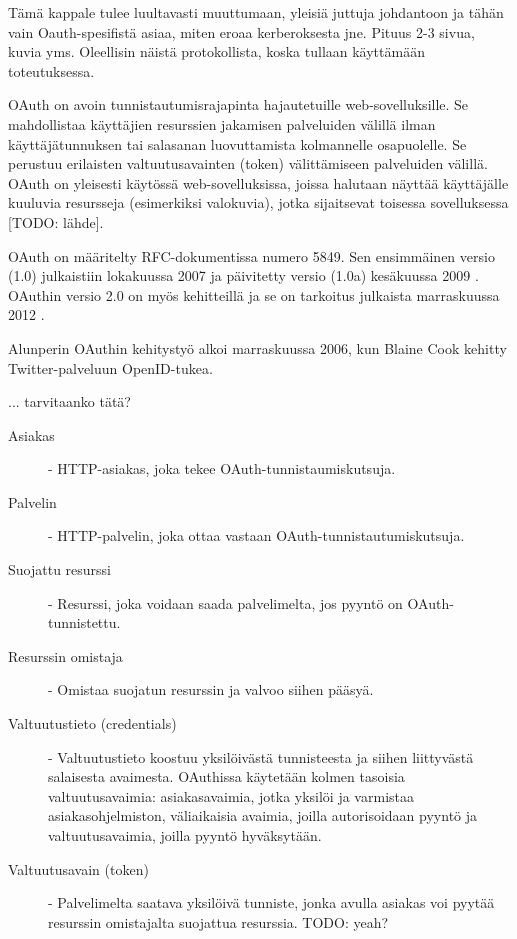 Tämä kappale tulee luultavasti muuttumaan, yleisiä juttuja johdantoon ja tähän vain Oauth-spesifistä asiaa, miten eroaa kerberoksesta jne. Pituus 2-3 sivua, kuvia yms. Oleellisin näistä protokollista, koska tullaan käyttämään toteutuksessa.

OAuth on avoin tunnistautumisrajapinta hajautetuille web-sovelluksille. Se mahdollistaa käyttäjien resurssien jakamisen palveluiden välillä ilman käyttäjätunnuksen tai salasanan luovuttamista kolmannelle osapuolelle. Se perustuu erilaisten valtuutusavainten (token) välittämiseen palveluiden välillä. OAuth on yleisesti käytössä web-sovelluksissa, joissa halutaan näyttää käyttäjälle kuuluvia resursseja (esimerkiksi valokuvia), jotka sijaitsevat toisessa sovelluksessa [TODO: lähde].

OAuth on määritelty RFC-dokumentissa numero 5849. Sen ensimmäinen versio (1.0) julkaistiin lokakuussa 2007 ja päivitetty versio (1.0a) kesäkuussa 2009 \cite{oauth2_0}. OAuthin versio 2.0 on myös kehitteillä ja se on tarkoitus julkaista marraskuussa 2012 \cite{oauth2_0}.

Alunperin OAuthin kehitystyö alkoi marraskuussa 2006, kun Blaine Cook kehitty Twitter-palveluun OpenID-tukea.

... tarvitaanko tätä?

\begin{description}
  \item[Asiakas] - HTTP-asiakas, joka tekee OAuth-tunnistaumiskutsuja.

  \item[Palvelin] - HTTP-palvelin, joka ottaa vastaan OAuth-tunnistautumiskutsuja.

  \item[Suojattu resurssi] - Resurssi, joka voidaan saada palvelimelta, jos pyyntö on OAuth-tunnistettu.

  \item[Resurssin omistaja] - Omistaa suojatun resurssin ja valvoo siihen pääsyä.

  \item[Valtuutustieto (credentials)] - Valtuutustieto koostuu yksilöivästä tunnisteesta ja siihen liittyvästä salaisesta avaimesta. OAuthissa käytetään kolmen tasoisia valtuutusavaimia: asiakasavaimia, jotka yksilöi ja varmistaa asiakasohjelmiston, väliaikaisia avaimia, joilla autorisoidaan pyyntö ja valtuutusavaimia, joilla pyyntö hyväksytään.

  \item[Valtuutusavain (token)] - Palvelimelta saatava yksilöivä tunniste, jonka avulla asiakas voi pyytää resurssin omistajalta suojattua resurssia. TODO: yeah?
\end{description}
